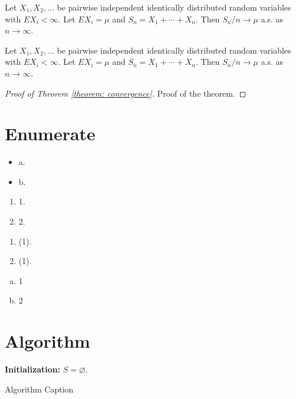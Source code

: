 \begin{corollary}\label{corollary: convergence}
    Let $X_1,X_2,\dots$ be pairwise independent identically distributed random variables with $EX_i<\infty$. Let $EX_i=\mu$ and $S_n=X_1+\cdots+X_n$. Then $S_n/n\rightarrow\mu$ a.s. as $n\rightarrow\infty$.
\end{corollary}

\begin{example}\label{example: convergence}
    Let $X_1,X_2,\dots$ be pairwise independent identically distributed random variables with $EX_i<\infty$. Let $EX_i=\mu$ and $S_n=X_1+\cdots+X_n$. Then $S_n/n\rightarrow\mu$ a.s. as $n\rightarrow\infty$.
\end{example}

\begin{proof}[Proof of Theorem \ref{theorem: convergence}]
    Proof of the theorem.
\end{proof}

\section{Enumerate}

\begin{itemize}
    \item a.
    \item b.
\end{itemize}

\begin{enumerate}
    \item 1.
    \item 2.
\end{enumerate}

\begin{enumerate}[(1)]
    \item (1).
    \item (1).
\end{enumerate}

\begin{enumerate}[(a)]
    \item 1
    \item 2
\end{enumerate}

\section{Algorithm}
\begin{algorithm}[htb]
    \SetAlgoLined
    {\bf Initialization:} $S=\varnothing$.
        
    \caption{Algorithm Caption}
    \label{algorithm: algorithm}
\end{algorithm}


